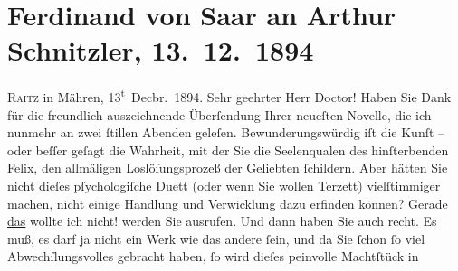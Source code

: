 

         
         \newcommand{\erwaehntePersonen}{Personen: }
         \newcommand{\erwaehnteInstitutionen}{}
         \newcommand{\erwaehnteOrte}{Orte: Rájec-Jestřebí, Wien}
         \newcommand{\erwaehnteWerke}{Werke: Sterben. Novelle}
               \section[Ferdinand von Saar an Arthur Schnitzler, 13. 12. 1894]{ Ferdinand von Saar an Arthur Schnitzler,
                    13. 12. 1894}\nopagebreak{}\rehead{ }\begin{ledgroupsized}[t]{13cm}\normalsize\beginnumbering \toendnotes[C]{\smallbreak\pagebreak[2]} 
\toendnotes[C]{\smallbreak}\pstart
           \raggedleft{}{\pb}\textsc{Raitz} in Mähren, 13\textsuperscript{t} Decbr. 1894.\pend
           \pstart{}Sehr geehrter Herr Doctor!\pend\pstart
           Haben Sie Dank für die freundlich auszeichnende Überſendung Ihrer neueſten Novelle, die ich nunmehr an zwei ſtillen Abenden
                    geleſen. Bewunderungswürdig iſt die Kunſt – oder beſſer geſagt die Wahrheit, mit
                    der Sie die Seelenqualen des hinſterbenden Felix, den allmäligen Loslöſungsprozeß der Geliebten ſchildern.
                    Aber hätten Sie nicht dieſes pſychologiſche Duett (oder wenn Sie wollen Terzett)
                    vielſtimmiger machen, nicht einige Handlung und Verwicklung dazu erfinden
                    können? Gerade \uline{das} wollte ich nicht! werden Sie
                    ausrufen. Und dann haben Sie auch recht. Es muß, es darf ja nicht ein Werk wie
                    das {\pb}andere ſein, und da Sie ſchon ſo
                    viel Abwechſlungsvolles gebracht haben, ſo wird dieſes peinvolle Machtſtück in

\end{ledgroupsized}
